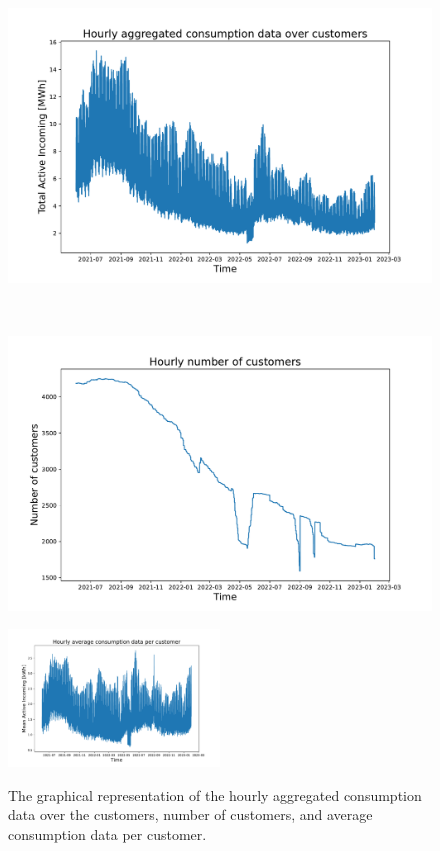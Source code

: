 \begin{figure}[H]
\begin{minipage}[b]{8.5cm}
\centering
\includegraphics[width=1\textwidth]{images/demand/data_plot}
\subcaption{}
\label{fig:demanddataplot}
\end{minipage}
\ \hspace{2mm} \
\begin{minipage}[b]{8.5cm}
\centering
\includegraphics[width=1\textwidth]{images/demand/customers_plot}
\subcaption{}
\label{fig:customersplot}
\end{minipage}
\begin{minipage}[b]{17cm}
\centering
\includegraphics[width=0.5\textwidth]{images/demand/mean_data_plot}
\subcaption{}
\label{fig:meandemanddataplot}
\end{minipage}
\caption{The graphical representation of the hourly  aggregated consumption data over the customers,  number of customers, and  average consumption data per customer.}
\end{figure}

